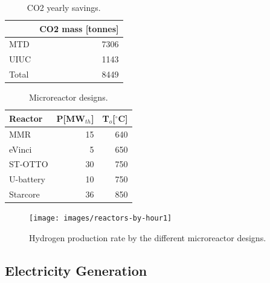 \documentclass[11pt,letterpaper]{article}
\begin{document}
    \column[t]{5cm}
	\begin{table}[!htb]
		\centering
	    \caption{\gls{CO2} yearly savings.}
		\begin{tabular}{lr}
		\hline
		            & \gls{CO2} mass [tonnes] \\ \hline
		MTD      	& 7306           \\
		UIUC        & 1143           \\
		Total       & 8449           \\ \hline
        \end{tabular}
        \label{tab:co2}
	\end{table}


	\begin{table}[!htb]
		\centering
	    \caption{Microreactor designs.}
		\begin{tabular}{lrr}
		\hline
		Reactor                                      & P[MW$_{th}$] & T$_o$[$^\circ$C] \\ \hline
		MMR \cite{usnc_mmr_2019}  		             & 15           & 640              \\
		eVinci \cite{hernandez_micro_2019}           & 5            & 650              \\
		ST-OTTO \cite{harlan_x-energy_2018}          & 30           & 750              \\
		U-battery \cite{ding_design_2011}            & 10           & 750              \\
		Starcore \cite{star_core_nuclear_star_2015}  & 36           & 850              \\ \hline
        \end{tabular}
        \label{tab:hydro-micro}
	\end{table}

	\begin{figure}[htbp!]
	    \centering
		\texttt{[image: images/reactors-by-hour1]}
		\hfill
		\caption{Hydrogen production rate by the different microreactor designs.}
		\label{fig:hydro-micro}
	\end{figure}

\subsection{Electricity Generation}
\end{document}
